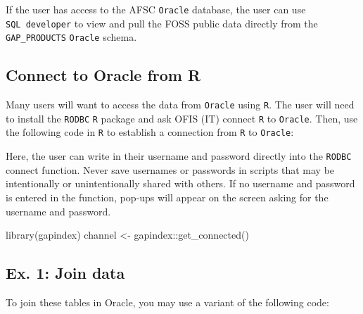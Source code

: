\documentclass[
  letterpaper,
  oneside,
  open=any]{scrbook}
\newenvironment{Shaded}{\begin{snugshade}}{\end{snugshade}}
\newcommand{\FunctionTok}[1]{\textcolor[rgb]{0.28,0.35,0.67}{#1}}
\newcommand{\NormalTok}[1]{\textcolor[rgb]{0.00,0.23,0.31}{#1}}
\newcommand{\OtherTok}[1]{\textcolor[rgb]{0.00,0.23,0.31}{#1}}
\newcommand{\SpecialCharTok}[1]{\textcolor[rgb]{0.37,0.37,0.37}{#1}}
\begin{document}
If the user has access to the AFSC \texttt{Oracle} database, the user
can use \texttt{SQL\ developer} to view and pull the FOSS public data
directly from the \texttt{GAP\_PRODUCTS} \texttt{Oracle} schema.

\hypertarget{connect-to-oracle-from-r-1}{%
\subsection{Connect to Oracle from R}\label{connect-to-oracle-from-r-1}}

Many users will want to access the data from \texttt{Oracle} using
\texttt{R}. The user will need to install the \texttt{RODBC} \texttt{R}
package and ask OFIS (IT) connect \texttt{R} to \texttt{Oracle}. Then,
use the following code in \texttt{R} to establish a connection from
\texttt{R} to \texttt{Oracle}:

Here, the user can write in their username and password directly into
the \texttt{RODBC} connect function. Never save usernames or passwords
in scripts that may be intentionally or unintentionally shared with
others. If no username and password is entered in the function, pop-ups
will appear on the screen asking for the username and password.

\begin{Shaded}
\begin{Highlighting}[]
\FunctionTok{library}\NormalTok{(gapindex)}
\NormalTok{channel }\OtherTok{\textless{}{-}}\NormalTok{ gapindex}\SpecialCharTok{::}\FunctionTok{get\_connected}\NormalTok{()}
\end{Highlighting}
\end{Shaded}

\hypertarget{ex.-1-join-data}{%
\subsection{Ex. 1: Join data}\label{ex.-1-join-data}}

To join these tables in Oracle, you may use a variant of the following
code:
\end{document}
